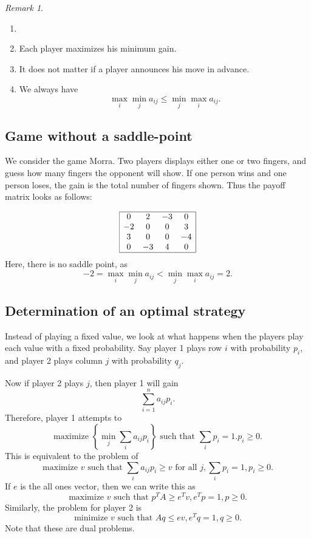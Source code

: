 \documentclass[12pt]{article}
\theoremstyle{definition}
\theoremstyle{remark}
\newtheorem*{remark}{Remark}
\begin{document}
\begin{remark}
	\begin{enumerate}[1.]
		\item[]
		\item Each player maximizes his minimum gain.
		\item It does not matter if a player announces his move in advance.
		\item We always have
			\[
			\max_{i} \min_{j} a_{ij} \leq \min_{j} \max_{i} a_{ij}
			.\]
	\end{enumerate}
\end{remark}

\subsection{Game without a saddle-point}%
\label{sub:game_without_a_saddle_point}

We consider the game Morra. Two players displays either one or two fingers, and guess how many fingers the opponent will show. If one person wins and one person loses, the gain is the total number of fingers shown. Thus the payoff matrix looks as follows:

\[
\begin{array}{|cccc|}
	\hline
	0 & 2 & -3 & 0 \\
	-2 & 0 & 0 & 3 \\
	3 & 0 & 0 & -4 \\
	0 & -3 & 4 & 0 \\
	\hline
\end{array}
\]
Here, there is no saddle point, as
\[
-2 = \max_{i} \min_{j} a_{ij} < \min_{j} \max_{i} a_{ij} = 2
.\]

\subsection{Determination of an optimal strategy}%
\label{sub:determination_of_an_optimal_strategy}

Instead of playing a fixed value, we look at what happens when the players play each value with a fixed probability. Say player 1 plays row $i$ with probability $p_i$, and player 2 plays column $j$ with probability $q_j$.

Now if player 2 plays $j$, then player 1 will gain
\[
\sum_{i = 1}^{n}a_{ij}p_i
.\]
Therefore, player 1 attempts to
\[
	\text{maximize } \left\{ \min_{j} \sum_{i}a_{ij}p_i \right\} \text{ such that } \sum_{i}p_i = 1. p_i \geq 0
.\]
This is equivalent to the problem of
\[
	\text{maximize } v \text{ such that } \sum_{i}a_{ij}p_i \geq v \text{ for all } j, \sum_{i}p_i = 1, p_i \geq 0
.\]
If $e$ is the all ones vector, then we can write this as
\[
	\text{maximize } v \text{ such that } p^{T}A \geq e^{T}v, e^{T}p = 1, p \geq 0 \tag{GP}\label{gproblem}
.\]
Similarly, the problem for player 2 is
\[
	\text{minimize } v \text{ such that } Aq \leq ev, e^{T}q = 1, q \geq 0 \tag{GD}\label{gdual}
.\]
Note that these are dual problems.
\end{document}
